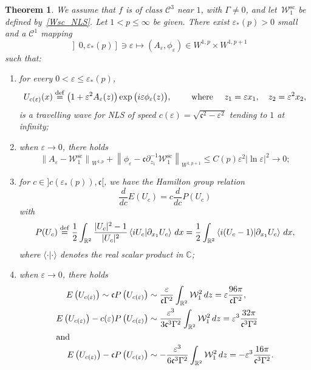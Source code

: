 \documentclass[10pt]{amsart}
\newtheorem{theo}{Theorem}[section]
\theoremstyle{definition}\newtheorem{defi}[theo]{Definition}\newtheorem{rema}[theo]{Remark}\newtheorem{exam}[theo]{Example}\newtheorem{exem}[theo]{Example}\newtheorem{nota}[theo]{Notation}
\newcommand*\p{\partial}
\newcommand*\R{\mathbb R}
\newcommand*\C{\mathbb C}
\newcommand*\ddef{\stackrel{\rm def}{=}}
\renewcommand{\sc}{\mathrm{sc}}
\newcommand*\BC{\mathcal{C}}
\newcommand*\BW{\mathcal{W}}
\newcommand*\cs{{\mathfrak c}}
\newcommand*\ii{\infty}
\newcommand*\ls{\leqslant }
\newcommand*\e{\varepsilon}
\newcommand*\lne{\lvert \ln \varepsilon \rvert}
\newcommand*{\romanenumi}{\renewcommand*{\theenumi}{\roman{enumi}}}
\begin{document}
\begin{theo}\label{mainTH}
We assume that $f$ is of class $ \BC^3 $ near $1 $, with $ \Gamma \neq 0 $, and let~$ \BW_1^{\sc} $ be defined by~\eqref{Wsc_NLS}. Let $ 1 < p \ls \ii $ be given. There exist $ \e_* (p) > 0 $ small and a $ \BC^1 $ mapping
\[
\left] 0, \e_*(p)\right] \ni \e \mapsto (A_\e, \phi_\e) \in W^{1,p} \times W^{1,p+1}
\]
such that:
\begin{enumerate}\romanenumi
\item\label{theo1.3.1} for every $ 0 < \e \ls \e_*(p) $,
\[
U_{c(\e)} (x) \ddef \big(1 + \e^2 A_\e (z) \big) \exp \big(i \e \phi_\e (z) \big),
\qquad \text{ where } \quad z_1 = \e x_1, \quad z_2 = \e^2 x_2,
\]
is a travelling wave for NLS of speed $ c(\e) = \sqrt{ \cs^2 - \e^2 } $ tending to $1$ at infinity;

\item\label{theo1.3.2} when $ \e \to 0 $, there holds
\[
\left\| A_\e - \BW_1^{\sc} \right\|_{ W^{1,p} } + \left\| \phi_\e - \cs \p_{z_1}^{-1} \BW_1^{\sc} \right\|_{ W^{1,p+1} }
\ls C(p) \e^2 \lne^2 \to 0 ;
\]
\item\label{theo1.3.3} for $ c \in] c(\e_*(p)), \cs [$, we have the Hamilton group relation
\[
\frac{d}{dc} E(U_c) = c \frac{d}{dc} P(U_c)
\]
with
\[
P(U_c) \ddef \frac{1}{2} \int_{\R^2} \frac{ \lvert U_c \rvert^2 - 1 }{ \lvert U_c \rvert^2 } \left\langle i U_c | \p_{x_1} U_c \right\rangle \, dx = \frac{1}{2} \int_{\R^2} \left\langle i (U_c - 1) \middle| \p_{x_1} U_c \right\rangle \, dx,
\]
where $ \langle \cdot | \cdot \rangle $ denotes the real scalar product in $ \C $;

\item\label{theo1.3.4} when $ \e \to 0 $, there holds
\begin{align*}
E\left(U_{c(\e)}\right) \sim \cs P \left(U_{c(\e)}\right) &\sim \frac{\e}{\cs \Gamma^2} \int_{\R^2} \BW_1^2 \, dz = \e \frac{96 \pi}{\cs \Gamma^2},
\\
E\left(U_{c(\e)}\right) - c(\e) P \left(U_{c(\e)}\right)
&\sim \frac{\e^3}{3 \cs^3 \Gamma^2} \int_{\R^2} \BW_1^2 \, dz = \e^3 \frac{32\pi}{\cs^3 \Gamma^2}
\\
\intertext{and}
E\left(U_{c(\e)}\right) - \cs P \left(U_{c(\e)}\right)
&\sim - \frac{\e^3}{6 \cs^3 \Gamma^2} \int_{\R^2} \BW_1^2 \, dz = - \e^3 \frac{16 \pi}{\cs^3 \Gamma^2}.
\end{align*}
\end{enumerate}
\end{theo}
\end{document}
